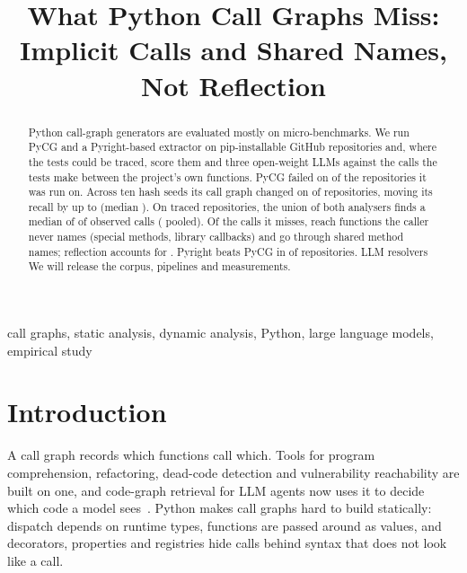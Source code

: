 \documentclass[conference]{IEEEtran}
\providecommand{\nRuntimeRepos}{\pending}
\providecommand{\rqFourAbstract}{\pending}
\newcommand{\sweepAbstract}{. Across ten hash seeds its call graph changed on \nSetNondet{} of \nSetSwept{} repositories, moving its recall by up to
  \sweepMaxDelta{} (median \sweepMedDelta).}
\newcommand{\sweepAbstract}{.}
\begin{document}
\title{What Python Call Graphs Miss:\\
Implicit Calls and Shared Names, Not Reflection}

\author{
}

\maketitle

\begin{abstract}
Python call-graph generators are evaluated mostly on micro-benchmarks. We run PyCG and a Pyright-based extractor
on \nStaticAttempted{} pip-installable GitHub repositories and, where the tests could be traced,
score them and three open-weight LLMs against the calls the tests make between the project's own
functions. PyCG failed on \pctPycgFailRun{} of the \nPycgRun{} repositories it was run
on\sweepAbstract{} On \nRuntimeRepos{} traced repositories, the union of both analysers finds a
median of \edgeUnionMed{} of observed calls (\poolRecallUnion{} pooled). Of the calls it misses,
\missUnnamedAll{} reach functions the caller never names (special methods, library callbacks) and
\missSharedAll{} go through shared method names; reflection accounts for \pctMissReflective.
Pyright beats PyCG in \nPyrightBeatsPycg{} of \nRuntimeRepos{} repositories. LLM
resolvers\rqFourAbstract{} We will release the corpus, pipelines and measurements.
\end{abstract}

\begin{IEEEkeywords}
call graphs, static analysis, dynamic analysis, Python, large language models, empirical study
\end{IEEEkeywords}

\section{Introduction}

A call graph records which functions call which. Tools for program comprehension, refactoring,
dead-code detection and vulnerability reachability are built on one, and code-graph retrieval
for LLM agents now uses it to decide which code a model sees~\cite{ouyang2024repograph}. Python
makes call graphs hard to build statically: dispatch depends on runtime types, functions are
passed around as values, and decorators, properties and registries hide calls behind syntax that
does not look like a call.
\end{document}
